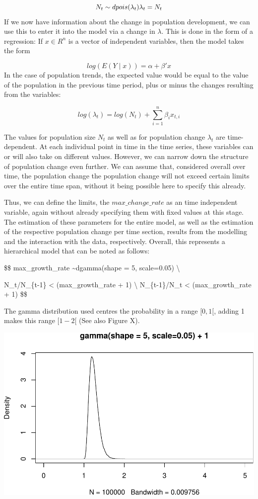 \documentclass[
]{article}
\begin{document}
\[
N_t \sim dpois(\lambda_t) \\
\lambda_t = N_t
\]
If we now have information about the change in population development, we can use this to enter it into the model via a change in \(\lambda\). This is done in the form of a regression: If \(x \in R^n\) is a vector of independent variables, then the model takes the form

\[
log({E} (Y\mid x))=\alpha + \beta' x
\]
In the case of population trends, the expected value would be equal to the value of the population in the previous time period, plus or minus the changes resulting from the variables:

\[
log(\lambda_t) = log(N_t) + \sum_{i=1}^n \beta_i x_{t,i}
\]

The values for population size \(N_t\) as well as for population change \(\lambda_t\) are time-dependent. At each individual point in time in the time series, these variables can or will also take on different values. However, we can narrow down the structure of population change even further. We can assume that, considered overall over time, the population change the population change will not exceed certain limits over the entire time span, without it being possible here to specify this already.

Thus, we can define the limits, the \(max\_change\_rate\) as an time independent variable, again without already specifying them with fixed values at this stage. The estimation of these parameters for the entire model, as well as the estimation of the respective population change per time section, results from the modelling and the interaction with the data, respectively. Overall, this represents a hierarchical model that can be noted as follows:

\$\$
max\_growth\_rate \sim dgamma(shape = 5, scale=0.05) \textbackslash{}

N\_t/N\_\{t-1\} \textless{} (max\_growth\_rate + 1) \textbackslash{}
N\_\{t-1\}/N\_t \textless{} (max\_growth\_rate + 1)
\$\$

The gamma distribution used centres the probability in a range \([0,1[\), adding 1 makes this range \([1-2[\) (See also Figure X).

\includegraphics{../figures/unnamed-chunk-1-1.pdf}
\end{document}
